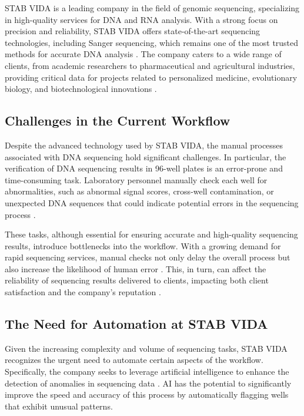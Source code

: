 STAB VIDA is a leading company in the field of genomic sequencing, specializing in high-quality services for DNA and RNA analysis. With a strong focus on precision and reliability, STAB VIDA offers state-of-the-art sequencing technologies, including Sanger sequencing, which remains one of the most trusted methods for accurate DNA analysis \cite{Sanger1981}. The company caters to a wide range of clients, from academic researchers to pharmaceutical and agricultural industries, providing critical data for projects related to personalized medicine, evolutionary biology, and biotechnological innovations \cite{Fujimura2015}.

\subsection{Challenges in the Current Workflow}

Despite the advanced technology used by STAB VIDA, the manual processes associated with DNA sequencing hold significant challenges. In particular, the verification of DNA sequencing results in 96-well plates is an error-prone and time-consuming task. Laboratory personnel manually check each well for abnormalities, such as abnormal signal scores, cross-well contamination, or unexpected DNA sequences that could indicate potential errors in the sequencing process \cite{Chakravarthy2020}.

These tasks, although essential for ensuring accurate and high-quality sequencing results, introduce bottlenecks into the workflow. With a growing demand for rapid sequencing services, manual checks not only delay the overall process but also increase the likelihood of human error \cite{Batista2021}. This, in turn, can affect the reliability of sequencing results delivered to clients, impacting both client satisfaction and the company's reputation \cite{Kumar2018}.

\subsection{The Need for Automation at STAB VIDA}

Given the increasing complexity and volume of sequencing tasks, STAB VIDA recognizes the urgent need to automate certain aspects of the workflow. Specifically, the company seeks to leverage artificial intelligence to enhance the detection of anomalies in sequencing data \cite{Jiang2021}. AI has the potential to significantly improve the speed and accuracy of this process by automatically flagging wells that exhibit unusual patterns.

